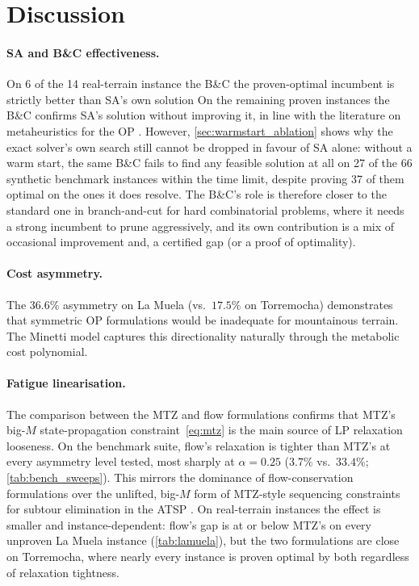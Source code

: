 \documentclass[11pt,a4paper]{article}
\begin{document}
\section{Discussion}
\label{sec:discussion}

\paragraph{SA and B\&C effectiveness.}
On 6 of the 14 real-terrain instance the B\&C the proven-optimal incumbent is strictly better than SA's own solution
On the remaining proven instances the B\&C confirms SA's solution without improving it, in line with the literature on metaheuristics for the OP \citep{vansteenwegen2011orienteering}. However, \cref{sec:warmstart_ablation} shows why the exact solver's own search still cannot be dropped in favour of SA alone: without a warm start, the same B\&C fails to find any feasible solution at all on 27 of the 66 synthetic benchmark instances within the time limit, despite proving 37 of them optimal on the ones it does resolve.
The B\&C's role is therefore closer to the standard one in branch-and-cut for hard combinatorial problems, where it needs a strong incumbent to prune aggressively, and its own contribution is a mix of occasional improvement and, a certified gap (or a proof of optimality).

\paragraph{Cost asymmetry.}
The $36.6\%$ asymmetry on La Muela (vs.\ $17.5\%$ on Torremocha) demonstrates that symmetric OP formulations would be inadequate for mountainous terrain.
The Minetti model captures this directionality naturally through the metabolic cost polynomial.

\paragraph{Fatigue linearisation.}
The comparison between the MTZ and flow formulations confirms that MTZ's big-$M$ state-propagation constraint~\eqref{eq:mtz} is the main source of LP relaxation looseness. On the benchmark suite, flow's relaxation is tighter than MTZ's at every asymmetry level tested, most sharply at $\alpha = 0.25$ ($3.7\%$ vs.\ $33.4\%$; \cref{tab:bench_sweeps}). This mirrors the dominance of flow-conservation formulations over the unlifted, big-$M$ form of MTZ-style sequencing constraints for subtour elimination in the ATSP \citep{oncan2009comparative}.
On real-terrain instances the effect is smaller and instance-dependent: flow's gap is at or below MTZ's on every unproven La Muela instance (\cref{tab:lamuela}), but the two formulations are close on Torremocha, where nearly every instance is proven optimal by both regardless of relaxation tightness.
\end{document}
